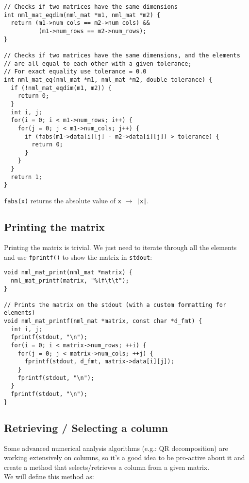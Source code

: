 \begin{verbatim}
// Checks if two matrices have the same dimensions
int nml_mat_eqdim(nml_mat *m1, nml_mat *m2) {
  return (m1->num_cols == m2->num_cols) &&
          (m1->num_rows == m2->num_rows);
}

// Checks if two matrices have the same dimensions, and the elements
// are all equal to each other with a given tolerance;
// For exact equality use tolerance = 0.0
int nml_mat_eq(nml_mat *m1, nml_mat *m2, double tolerance) {
  if (!nml_mat_eqdim(m1, m2)) {
    return 0;
  }
  int i, j;
  for(i = 0; i < m1->num_rows; i++) {
    for(j = 0; j < m1->num_cols; j++) {
      if (fabs(m1->data[i][j] - m2->data[i][j]) > tolerance) {
        return 0;
      }
    }
  }
  return 1;
}
\end{verbatim}
{\tt fabs(x)} returns the absolute value of {\tt x} $\rightarrow$ {\tt |x|}.

\subsection{Printing the matrix}

Printing the matrix is trivial. We just need to iterate through all the elements and use {\tt fprintf()} to show the matrix in {\tt stdout}:

\begin{verbatim}
void nml_mat_print(nml_mat *matrix) {
  nml_mat_printf(matrix, "%lf\t\t");
}

// Prints the matrix on the stdout (with a custom formatting for elements)
void nml_mat_printf(nml_mat *matrix, const char *d_fmt) {
  int i, j;
  fprintf(stdout, "\n");
  for(i = 0; i < matrix->num_rows; ++i) {
    for(j = 0; j < matrix->num_cols; ++j) {
      fprintf(stdout, d_fmt, matrix->data[i][j]);
    }
    fprintf(stdout, "\n");
  }
  fprintf(stdout, "\n");
} 
\end{verbatim}

\subsection{Retrieving / Selecting a column}

Some advanced numerical analysis algorithms (e.g.: QR decomposition) are working extensively on columns, so it’s a good idea to be pro-active about it and create a method that selects/retrieves a column from a given matrix.
\\

We will define this method as:

